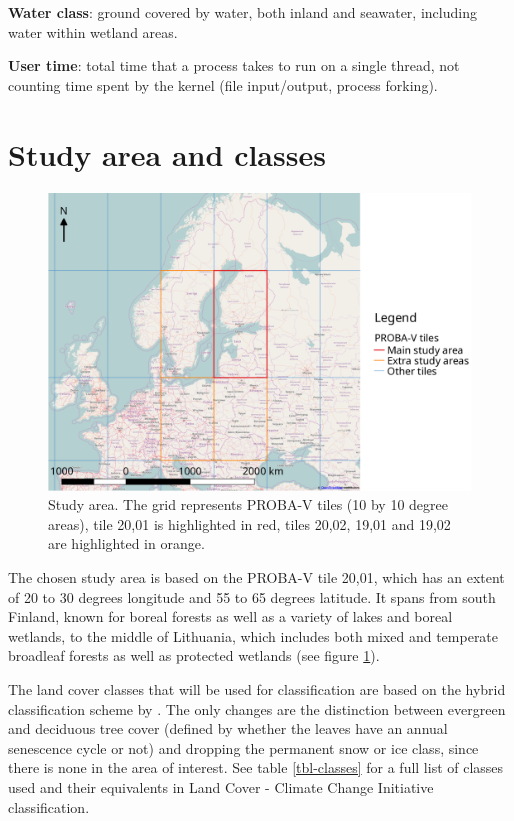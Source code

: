 \documentclass[a4paper,10pt]{book}
\begin{document}
\textbf{Water class}: ground covered by water, both inland and seawater, including water within wetland areas.

\textbf{User time}: total time that a process takes to run on a single thread, not counting time spent by the kernel (file input/output, process forking).

\section{Study area and classes}

\begin{figure}
 \includegraphics[width=\textwidth]{./proposal-figures/studyarea.png}
 \caption{Study area. The grid represents PROBA-V tiles (10 by 10 degree areas), tile 20,01 is highlighted in red, tiles 20,02, 19,01 and 19,02 are highlighted in orange.}
 \label{AOI}
\end{figure} 

The chosen study area is based on the PROBA-V tile 20,01, which has an extent of 20 to 30 degrees longitude and 55 to 65 degrees latitude. It spans from south Finland, known for boreal forests as well as a variety of lakes and boreal wetlands, to the middle of Lithuania, which includes both mixed and temperate broadleaf forests as well as protected wetlands (see figure \ref{AOI}).

The land cover classes that will be used for classification are based on the hybrid classification scheme by \citep{see2015hybrid}. The only changes are the distinction between evergreen and deciduous tree cover (defined by whether the leaves have an annual senescence cycle or not) and dropping the permanent snow or ice class, since there is none in the area of interest. See table \ref{tbl-classes} for a full list of classes used and their equivalents in Land Cover - Climate Change Initiative classification.
\end{document}
